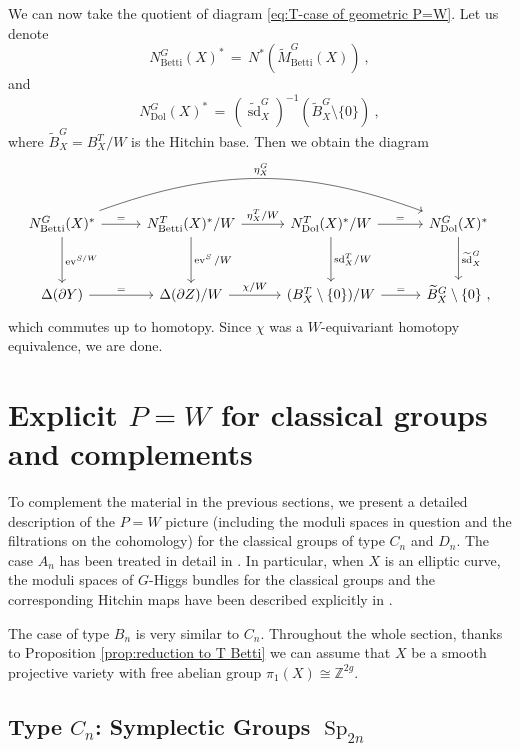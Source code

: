 \documentclass[11pt, a4paper]{amsart}
\theoremstyle{definition}
\theoremstyle{myitemstyle}
\DeclareMathOperator{\Sp}{Sp}
\DeclareMathOperator{\ev}{ev}
\newcommand{\Dol}{{\mathrm{Dol}}}
\newcommand{\Betti}{{\mathrm{Betti}}}
\newcommand{\sd}{{\operatorname{sd}}}
\newcommand{\equ}{\ensuremath{\,=\,}}
\begin{document}
We can now take the quotient of diagram \eqref{eq:T-case of geometric P=W}.  Let us  denote 
\[
N^G_\Betti(X)^* \equ N^*(\widetilde M^G_\Betti(X))\ ,
\]
and 
\[
N^G_\Dol(X)^* \equ  (\widetilde \sd_X^G)^{-1}(\widetilde B^G_X\setminus\{0\})\ ,
\]
where $\widetilde B^G_X= B^T_X/W$ is the Hitchin base. Then we obtain the  diagram
\[
\begin{tikzcd}
    N^G_\Betti(X)^*
    \arrow[r,"="]
    \arrow[rrr,bend left=20,"\eta^G_X"]
    \arrow[d,"\ev^{S/W}"]&[1ex]
        N^T_\Betti(X)^*/W
        \arrow[d, "\ev^S/W"]
        \arrow[r, "\eta^T_X/W"] &[1ex]
            N^T_\Dol(X)^*/W
            \arrow[d,"\sd^T_X/W"]
            \arrow[r,"="]&[1ex]
                N^G_\Dol(X)^*
                \arrow[d,"\widetilde\sd^G_X"]\\[3ex]
    \Delta(\partial Y)
    \arrow[r,"="]&
        \Delta(\partial Z)/W
        \arrow[r,"\chi/W"]&
            (B^T_X\setminus \{0\})/W
            \arrow[r,"="]&
                \widetilde B^G_X\setminus\{0\}\ ,
\end{tikzcd}    
\]
which commutes up to homotopy. Since  $\chi$ was a $W$-equivariant homotopy equivalence, we are done.


\section{Explicit $P=W$ for classical groups and complements}
\label{sec:pwclassicalgroups}

To complement the material in the previous sections, we present a detailed description of the $P=W$ picture (including the moduli spaces in question and the filtrations on the cohomology) for the classical groups of type $C_n$ and $D_n$. The case $A_n$ has been treated in detail in \cite{BKU23}. In particular, when $X$ is an elliptic curve, the moduli spaces of $G$-Higgs bundles for the classical groups and the corresponding Hitchin maps have been described explicitly in \cite{FGN14}.

The case of type $B_n$ is very similar to $C_n$. 
Throughout the whole section, thanks to Proposition \ref{prop:reduction to T Betti} we can assume that $X$ be a smooth projective variety with free abelian group $\pi_1(X)\cong \mathbb{Z}^{2g}$.

 
\subsection{Type $C_n$: Symplectic Groups $\Sp_{2n}$}
\label{subsec:type-Cn}
\end{document}
